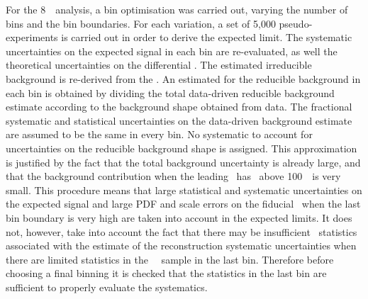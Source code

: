 For the 8~\tev\ analysis, a bin optimisation was carried out, varying
the number of bins and the bin boundaries. For each variation, a set of 5,000
pseudo-experiments is carried out in order to derive the expected limit. The systematic uncertainties on the expected signal
in each bin are re-evaluated, as well the theoretical uncertainties on the
differential \cx. The estimated irreducible background is re-derived from the
\mc. An estimated for the reducible background in each bin is obtained by dividing the total
data-driven reducible background estimate according to the background shape obtained from data. The
fractional systematic and statistical uncertainties on the data-driven background
estimate are assumed to be the same in every bin. No systematic to
account for uncertainties on the reducible background shape is assigned. This
approximation is justified by the fact that the total background uncertainty is
already large, and that the background contribution when the leading \Z\ has
\pt\ above 100~\gev\ is very small.
This procedure means that large statistical and systematic uncertainties on the
expected signal and large PDF and scale errors on the fiducial \cx\ when the last bin boundary is
very high are taken into account in the expected limits. It does
not, however, take into account the fact that there may be insufficient \mc\
statistics associated with the estimate of the reconstruction systematic uncertainties when
there are limited statistics in the \sm\ \mc\ sample in the last bin. Therefore
before choosing a final binning it is checked that the statistics in the last
bin are sufficient to properly evaluate the systematics.

